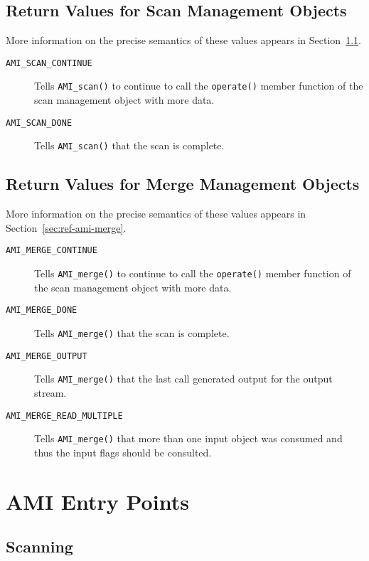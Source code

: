 \subsection{Return Values for Scan Management Objects}

More information on the precise semantics of these values appears in
Section~\ref{sec:ref-ami-scan}.
\begin{description}
\item[{\tt AMI\_SCAN\_CONTINUE}] Tells \verb|AMI_scan()| to continue
  to call the \verb|operate()| member function of the scan management
  object with more data.
\item[{\tt AMI\_SCAN\_DONE}] Tells \verb|AMI_scan()| that the scan is
  complete. 
\end{description}

\subsection{Return Values for Merge Management Objects}

More information on the precise semantics of these values appears in
Section~\ref{sec:ref-ami-merge}.
\begin{description}
\item[{\tt AMI\_MERGE\_CONTINUE}] Tells \verb|AMI_merge()| to continue
  to call the \verb|operate()| member function of the scan management
  object with more data.
\item[{\tt AMI\_MERGE\_DONE}] Tells \verb|AMI_merge()| that the scan is
  complete. 
\item[{\tt AMI\_MERGE\_OUTPUT}]  Tells \verb|AMI_merge()| that the
  last call generated output for the output stream.
\item[{\tt AMI\_MERGE\_READ\_MULTIPLE}]  Tells \verb|AMI_merge()| that
  more than one input object was consumed and thus the input flags
  should be consulted.
\end{description}


\section{AMI Entry Points}



\subsection{Scanning}
\label{sec:ref-ami-scan}

